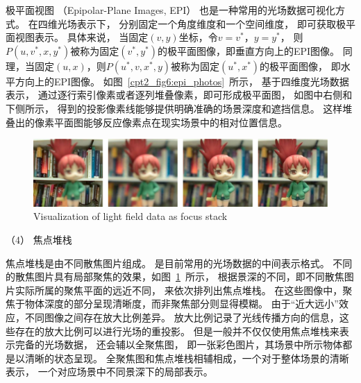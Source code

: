 极平面视图
（Epipolar-Plane Images, EPI）
也是一种常用的光场数据可视化方式。
在四维光场表示下，
分别固定一个角度维度和一个空间维度，
即可获取极平面视图表示。
具体来说，
当固定$(v, y)$坐标，令$v=v^{*}$，$y=y^{*}$，
则$ P(u, v^{*}, x, y^{*})$被称为固定$(v^{*}, y^{*})$的极平面图像，即垂直方向上的EPI图像。
同理，当固定$(u, x)$，则$ P(u^{*}, v, x^{*}, y)$被称为固定$(u^{*}, x^{*})$的极平面图像，
即水平方向上的EPI图像。
如图~\ref{cpt2_fig6:epi_photos}~所示，
基于四维度光场数据表示，
通过逐行索引像素或者逐列堆叠像素，即可形成极平面图，
如图中右侧和下侧所示，
得到的投影像素线能够提供明确准确的场景深度和遮挡信息。
这样堆叠出的像素平面图能够反应像素点在现实场景中的相对位置信息。














\begin{figure}[b]
	\centering
	\includegraphics[width=0.95\linewidth]{figures/chapter2/focal_stack}
	{Visualization of light field data as focus stack}  
	\label{cpt2_fig7:focal_stack}
\end{figure}






（4）
焦点堆栈






焦点堆栈是由不同散焦图片组成。
是目前常用的光场数据的中间表示格式。
不同的散焦图片具有局部聚焦的效果，如图~\ref{cpt2_fig7:focal_stack}~所示，
根据景深的不同，即不同散焦图片实际所属的聚焦平面的远近不同，
来依次排列出焦点堆栈。
在这些图像中，聚焦于物体深度的部分呈现清晰度，而非聚焦部分则显得模糊。
由于“近大远小”效应，不同图像之间存在放大比例差异。
放大比例记录了光线传播方向的信息，这些存在的放大比例可以进行光场的重投影。
但是一般并不仅仅使用焦点堆栈来表示完备的光场数据，
还会辅以全聚焦图，
即一张彩色图片，其场景中所示物体都是以清晰的状态呈现。
全聚焦图和焦点堆栈相辅相成，一个对于整体场景的清晰表示，
一个对应场景中不同景深下的局部表示。



